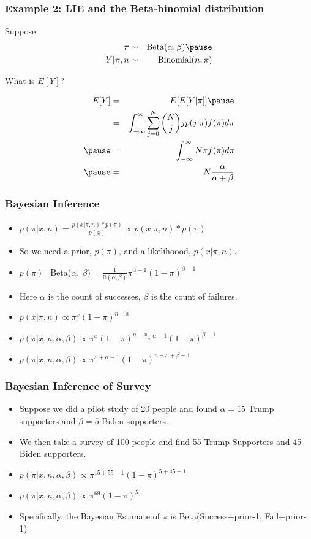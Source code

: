 \documentclass{beamer}
\numberwithin{equation}{section}
\begin{document}
\begin{frame}
\frametitle{Example 2: LIE and the Beta-binomial distribution}

Suppose 
\begin{eqnarray}
\pi & \sim & \text{Beta}(\alpha, \beta) \nonumber \pause \\
Y|\pi, n & \sim & \text{Binomial}(n, \pi)\nonumber 
\end{eqnarray}

What is $E[Y]$? \pause 

\begin{eqnarray}
E[Y] & = & E[E[Y| \pi]] \nonumber \pause  \\ 
& = & \int_{-\infty}^{\infty} \sum_{j = 0}^{N} {{N}\choose{j}} j p(j|\pi) f(\pi) d\pi \nonumber \\ \pause 
& = & \int_{-\infty}^{\infty} N \pi f(\pi) d\pi \nonumber  \\ \pause 
& = & N \frac{\alpha}{\alpha + \beta} \nonumber  
\end{eqnarray}

\end{frame}

\begin{frame}
\frametitle{Bayesian Inference}
\begin{itemize}
\item $p(\pi|x,n)= \frac{p(x|\pi,n)*p(\pi)}{p(x)}\propto p(x|\pi,n)*p(\pi)$
\item So we need a prior, $p(\pi)$, and a likelihoood, $p(x|\pi, n)$.
\item $p(\pi)$=Beta($\alpha,\ \beta)= \frac{1}{\mathbb{B}(\alpha, \beta)}\pi^{\alpha- 1} (1- \pi)^{\beta - 1}$
\item Here $\alpha$ is the count of successes, $\beta$ is the count of failures.
\item $p(x|\pi, n)\propto\pi^x(1-\pi)^{n-x}$\pause
\item $p(\pi|x,n,\alpha, \beta)\propto \pi^{x}(1-\pi)^{n-x}\pi^{\alpha- 1} (1- \pi)^{\beta - 1}$
\item $p(\pi|x,n,\alpha, \beta)\propto \pi^{x+\alpha-1}(1-\pi)^{n-x+\beta-1}$  
\end{itemize}
\end{frame}



\begin{frame}
\frametitle{Bayesian Inference of Survey}
\begin{itemize}
\item Suppose we did a pilot study of 20 people and found $\alpha=15$ Trump supporters and $\beta=5$ Biden supporters.
\item We then take a survey of 100 people and find 55 Trump Supporters and 45 Biden supporters.
\item $p(\pi | x,n,\alpha, \beta)\propto \pi^{15+55-1}(1-\pi)^{5+45-1}$  
\item $p(\pi | x,n,\alpha, \beta)\propto \pi^{69}(1-\pi)^{51}$  \pause
\item Specifically, the Bayesian Estimate of $\pi$ is Beta(Success+prior-1, Fail+prior-1)
\end{itemize}
\end{frame}
\end{document}
